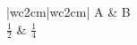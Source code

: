 \documentclass{article}
\begin{document}
\begin{tabular}{|w{c}{2cm}|w{c}{2cm}|}
\hline
A & B \\
\hline
$\frac12$ & $\frac14$ \\
\hline
\end{tabular}
\end{document}
